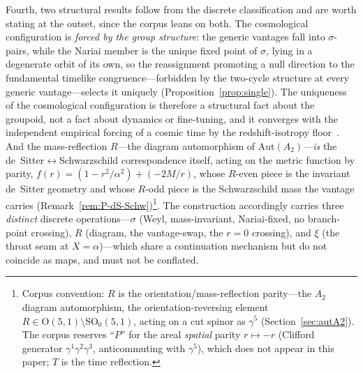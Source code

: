 \documentclass[11pt,a4paper]{article}
\theoremstyle{definition}
\begin{document}
Fourth, two structural results follow from the discrete classification and are worth stating at the outset, since the corpus leans on both. The cosmological configuration is \emph{forced by the group structure}: the generic vantages fall into $\sigma$-pairs, while the Nariai member is the unique fixed point of $\sigma$, lying in a degenerate orbit of its own, so the reassignment promoting a null direction to the fundamental timelike congruence---forbidden by the two-cycle structure at every generic vantage---selects it uniquely (Proposition~\ref{prop:single}). The uniqueness of the cosmological configuration is therefore a structural fact about the groupoid, not a fact about dynamics or fine-tuning, and it converges with the independent empirical forcing of a cosmic time by the redshift-isotropy floor~\cite{JanzenModernParallax}. And the mass-reflection $R$---the diagram automorphism of $\mathrm{Aut}(A_{2})$---\emph{is} the de~Sitter$\leftrightarrow$Schwarzschild correspondence itself, acting on the metric function by parity, $f(r)=(1-r^{2}/\alpha^{2})+(-2M/r)$, whose $R$-even piece is the invariant de~Sitter geometry and whose $R$-odd piece is the Schwarzschild mass the vantage carries (Remark~\ref{rem:P-dS-Schw})\footnote{Corpus convention: $R$ is the orientation/mass-reflection parity---the $A_{2}$ diagram automorphism, the orientation-reversing element $R\in\mathrm{O}(5,1)\setminus\mathrm{SO}_{0}(5,1)$, acting on a cut spinor as $\gamma^{5}$ (Section~\ref{sec:autA2}). The corpus reserves ``$P$'' for the areal \emph{spatial} parity $r\mapsto-r$ (Clifford generator $\gamma^{1}\gamma^{2}\gamma^{3}$, anticommuting with $\gamma^{5}$), which does not appear in this paper; $T$ is the time reflection.}. The construction accordingly carries three \emph{distinct} discrete operations---$\sigma$ (Weyl, mass-invariant, Nariai-fixed, no branch-point crossing), $R$ (diagram, the vantage-swap, the $r=0$ crossing), and $\xi$ (the throat seam at $X=\alpha$)---which share a continuation mechanism but do not coincide as maps, and must not be conflated.
\end{document}
